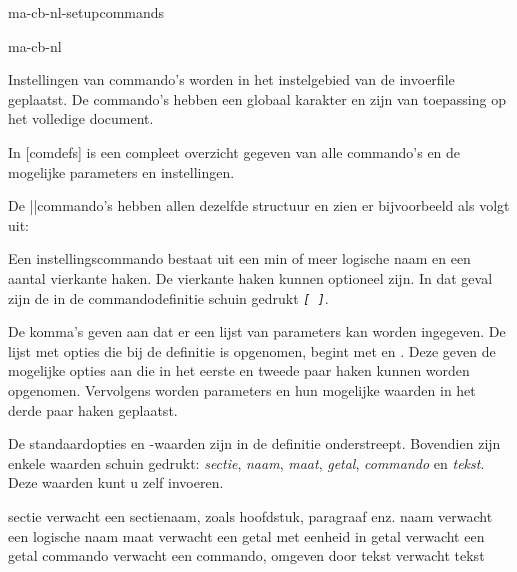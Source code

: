 \startonderdeel ma-cb-nl-setupcommands

\produkt ma-cb-nl



Instellingen van commando's worden in het instelgebied van de
invoerfile geplaatst. De commando's hebben een globaal
karakter en zijn van toepassing op het volledige document.

In [comdefs] is een compleet overzicht gegeven
van alle commando's en de mogelijke parameters en
instellingen.

De ||commando's hebben allen dezelfde
structuur en zien er bijvoorbeeld als volgt uit:

\startbuffer
{}
\stopbuffer

\haalbuffer


Een instellingscommando bestaat uit een min of meer logische
naam en een aantal vierkante haken. De vierkante haken
kunnen optioneel zijn. In dat geval zijn de \type{[ ]} in de
commandodefinitie schuin gedrukt {\tt \sl [ ]}.

\starttypen
\steleencommandoin[.1.][.2.][..,..=..,..]
\stoptypen

De komma's geven aan dat er een lijst van parameters kan
worden ingegeven. De lijst met opties die bij de definitie
is opgenomen, begint met  en . Deze geven
de mogelijke opties aan die in het eerste en tweede paar
haken kunnen worden opgenomen. Vervolgens worden parameters
en hun mogelijke waarden in het derde paar haken geplaatst.

De standaardopties en -waarden zijn in de definitie
onderstreept. Bovendien zijn enkele waarden schuin gedrukt:
{\sl sectie}, {\sl naam}, {\sl maat}, {\sl
getal}, {\sl commando} en {\sl tekst}. Deze waarden kunt u
zelf invoeren.

\starttabulatie[|S||]
\NC sectie   \NC  verwacht een sectienaam, zoals hoofdstuk, paragraaf enz. \NC\NR
\NC naam     \NC verwacht een logische naam \NC\NR
\NC maat     \NC verwacht een getal met eenheid in  \NC\NR
\NC getal    \NC verwacht een getal \NC\NR
\NC commando \NC verwacht een commando, omgeven door \type{{}} \NC\NR
\NC tekst    \NC verwacht tekst \NC\NR
\stoptabulatie

\stoponderdeel
